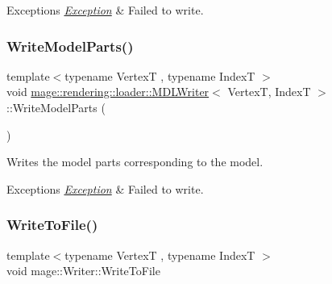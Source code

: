 \begin{DoxyExceptions}{Exceptions}
{\em \mbox{\hyperlink{classmage_1_1_exception}{Exception}}} & Failed to write. \\
\hline
\end{DoxyExceptions}
\mbox{\label{classmage_1_1rendering_1_1loader_1_1_m_d_l_writer_a8fcd997a51d7a46149596d332ebdb8e1}} 
\subsubsection{\texorpdfstring{Write\+Model\+Parts()}{WriteModelParts()}}
{\footnotesize\ttfamily template$<$typename VertexT , typename IndexT $>$ \\
void \mbox{\hyperlink{classmage_1_1rendering_1_1loader_1_1_m_d_l_writer}{mage\+::rendering\+::loader\+::\+M\+D\+L\+Writer}}$<$ VertexT, IndexT $>$\+::Write\+Model\+Parts (\begin{DoxyParamCaption}{ }\end{DoxyParamCaption})\hspace{0.3cm}{\ttfamily [private]}}

Writes the model parts corresponding to the model.


\begin{DoxyExceptions}{Exceptions}
{\em \mbox{\hyperlink{classmage_1_1_exception}{Exception}}} & Failed to write. \\
\hline
\end{DoxyExceptions}
\mbox{\label{classmage_1_1rendering_1_1loader_1_1_m_d_l_writer_ac01e930b55888da88e345b0910d4b1c2}} 
\subsubsection{\texorpdfstring{Write\+To\+File()}{WriteToFile()}}
{\footnotesize\ttfamily template$<$typename VertexT , typename IndexT $>$ \\
void mage\+::\+Writer\+::\+Write\+To\+File}

